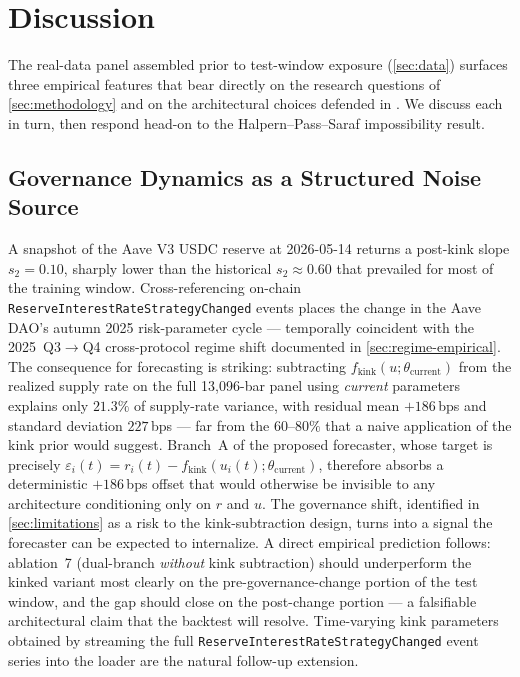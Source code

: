 
\section{Discussion}
\label{sec:discussion}

The real-data panel assembled prior to test-window exposure
(\cref{sec:data}) surfaces three empirical features that bear directly
on the research questions of \cref{sec:methodology} and on the
architectural choices defended in \cite{solovev2026lob}. We discuss
each in turn, then respond head-on to the
Halpern--Pass--Saraf impossibility result.

\subsection{Governance Dynamics as a Structured Noise Source}
\label{sec:governance-noise}

A snapshot of the Aave V3 USDC reserve at 2026-05-14 returns a
post-kink slope $s_2 = 0.10$, sharply lower than the
historical $s_2 \approx 0.60$ that prevailed for most of the training
window. Cross-referencing on-chain
\texttt{ReserveInterestRateStrategyChanged} events places the change
in the Aave DAO's autumn 2025 risk-parameter cycle --- temporally
coincident with the 2025~Q3$\to$Q4 cross-protocol regime shift
documented in \cref{sec:regime-empirical}. The consequence for
forecasting is striking: subtracting
$f_{\text{kink}}(u;\theta_{\text{current}})$ from the realized supply
rate on the full 13{,}096-bar panel using
\emph{current} parameters explains only $21.3\%$ of supply-rate
variance, with residual mean $+186$\,bps and standard deviation
$227$\,bps --- far from the $60$--$80\%$ that a naive application of
the kink prior would suggest. Branch~A of the proposed forecaster,
whose target is precisely
$\varepsilon_i(t)=r_i(t)-f_{\text{kink}}(u_i(t);\theta_{\text{current}})$,
therefore absorbs a deterministic $+186$\,bps offset that would
otherwise be invisible to any architecture conditioning only on $r$
and $u$. The governance shift, identified in
\cref{sec:limitations} as a risk to the kink-subtraction design,
turns into a signal the forecaster can be expected to internalize.
A direct empirical prediction follows: ablation~7 (dual-branch
\emph{without} kink subtraction) should underperform the kinked
variant most clearly on the pre-governance-change portion of the
test window, and the gap should close on the post-change portion ---
a falsifiable architectural claim that the backtest will resolve.
Time-varying kink parameters obtained by streaming the full
\texttt{ReserveInterestRateStrategyChanged} event series into the
loader are the natural follow-up extension.

